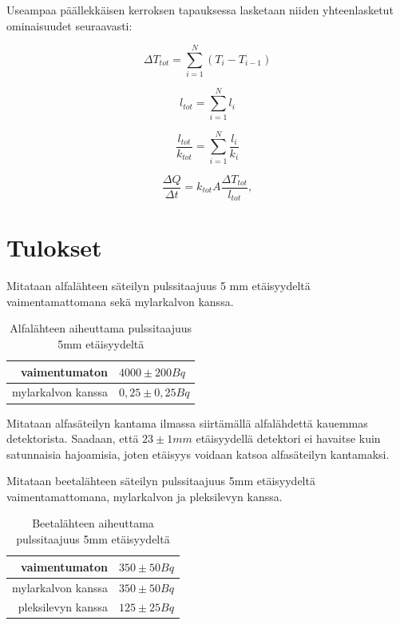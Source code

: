 \documentclass[a4paper,11pt]{article}
\begin{document}
Useampaa päällekkäisen kerroksen tapauksessa lasketaan niiden yhteenlasketut ominaisuudet seuraavasti: 

\begin{equation}
  \Delta T_{tot} = \sum_{i=1}^N (T_i - T_{i-1})
\end{equation}

\begin{equation}
  l_{tot} = \sum_{i=1}^N l_i
\end{equation}

\begin{equation}
  \frac{l_{tot}}{k_{tot}} = \sum_{i=1}^N \frac{l_i}{k_i}
\end{equation}

\begin{equation}
  \frac{\Delta Q}{\Delta t} = k_{tot} A \frac{\Delta T_{tot}}{l_{tot}} ,
\end{equation}

\section{Tulokset}

Mitataan alfalähteen säteilyn pulssitaajuus 5 mm etäisyydeltä vaimentamattomana sekä mylarkalvon kanssa. 
\begin{table}[H]
\begin{center}
\caption{Alfalähteen aiheuttama pulssitaajuus 5mm etäisyydeltä}
\begin{tabular}{ | r | l | }
  \hline 
  vaimentumaton & $4000 \pm 200 Bq$ \\ \hline
  mylarkalvon kanssa & $0,25 \pm 0,25 Bq$ \\ \hline
\end{tabular}
\end{center}
\end{table}

Mitataan alfasäteilyn kantama ilmassa siirtämällä alfalähdettä kauemmas detektorista. Saadaan, että $23 \pm 1 mm$ etäisyydellä detektori ei havaitse kuin satunnaisia hajoamisia, joten etäisyys voidaan katsoa alfasäteilyn kantamaksi. 

Mitataan beetalähteen säteilyn pulssitaajuus 5mm etäisyydeltä vaimentamattomana, mylarkalvon ja pleksilevyn kanssa.
\begin{table}[H]
\begin{center}
\caption{Beetalähteen aiheuttama pulssitaajuus 5mm etäisyydeltä}
\begin{tabular}{ | r | l | }
  \hline
  vaimentumaton & $350 \pm 50 Bq$ \\ \hline
  mylarkalvon kanssa & $350 \pm 50 Bq$ \\ \hline
  pleksilevyn kanssa & $125 \pm 25 Bq$ \\ \hline
\end{tabular}
\end{center}
\end{table}
   
\end{document}
